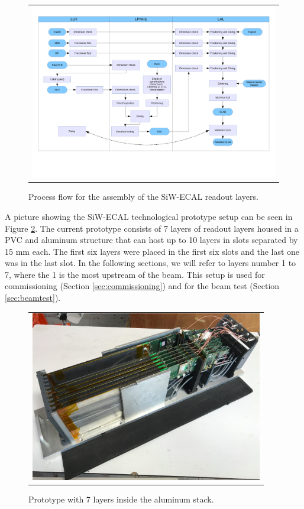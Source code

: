 \documentclass[a4paper,11pt]{article}
\begin{document}
\begin{figure}[!t]
\centering
\begin{tabular}{l}
\includegraphics[width=6.0in]{SiW-ECAL-Process_Flow_v2018.pdf}
\end{tabular}
\caption{Process flow for the assembly of the SiW-ECAL readout layers.}
\label{assembly}
\end{figure}


A picture showing the SiW-ECAL technological prototype setup can be seen in Figure \ref{proto}.
The current prototype consists of 7 layers of 
readout layers housed in a PVC and aluminum structure that can host up to 10 layers in slots separated by 15 mm each.
The first six layers were placed in the first six slots and the last one was in the last slot.
In the following sections, we will refer to layers number 1 to 7, where
the 1 is the most upstream of the beam.
This setup is used for commissioning (Section \ref{sec:commissioning}) and for the beam test
(Section \ref{sec:beamtest}).

\begin{figure}[!ht]
\centering
\begin{tabular}{l}
\includegraphics[width=4.0in]{proto.png} 
\end{tabular}
\caption{Prototype with 7 layers inside the aluminum stack.}
\label{proto}
\end{figure}
\end{document}
